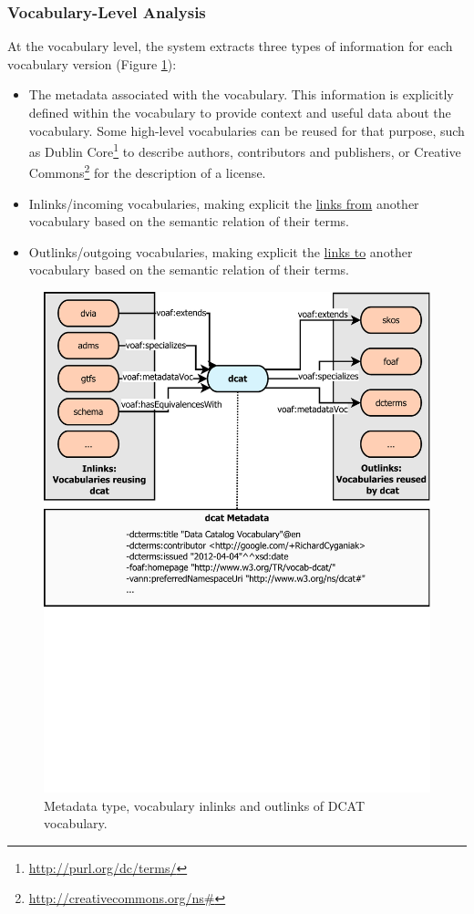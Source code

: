 \documentclass{iosart2c}
\begin{document}
\subsubsection{Vocabulary-Level Analysis}\label{sec:vocabLevelAnalysis}
At the vocabulary level, the system extracts three types of information for each vocabulary version (Figure \ref{fig:dcat}):
\begin{itemize}
\item The metadata associated with the vocabulary. This information is explicitly defined within the vocabulary to provide context and useful data about the vocabulary. Some high-level vocabularies can be reused for that purpose, such as Dublin Core\footnote{\url{http://purl.org/dc/terms/}} to describe authors, contributors and publishers, or Creative Commons\footnote{\url{http://creativecommons.org/ns\#}} for the description of a license.

\item Inlinks/incoming vocabularies, making explicit the \underline{links from} another vocabulary based on the semantic relation of their terms.

\item Outlinks/outgoing vocabularies, making explicit the \underline{links to} another vocabulary based on the semantic relation of their terms.
\end{itemize}

\begin{figure}[ht!b]
\includegraphics[trim={0cm 10cm 0cm 0cm},width=1\textwidth]{FlowCharts/DCAT.pdf}
\caption{Metadata type, vocabulary inlinks and outlinks of DCAT vocabulary.}
\label{fig:dcat}
\end{figure}
\end{document}
